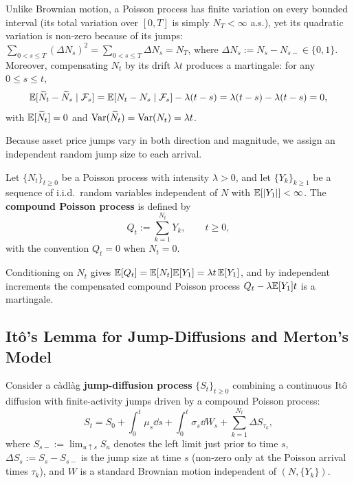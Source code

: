 Unlike Brownian motion, a Poisson process has finite variation on every bounded interval (its total variation over $[0, T]$ is simply $N_T < \infty$ a.s.), yet its quadratic variation is non-zero because of its jumps: $\sum_{0 < s \le T} (\Delta N_s)^2 = \sum_{0 < s \le T} \Delta N_s = N_T$, where $\Delta N_s := N_s - N_{s-} \in \{0, 1\}$. Moreover, compensating $N_t$ by its drift $\lambda t$ produces a martingale: for any $0 \le s \le t$,
\[
\mathbb{E}[\widetilde{N}_t - \widetilde{N}_s \mid \mathcal{F}_s] = \mathbb{E}[N_t - N_s \mid \mathcal{F}_s] - \lambda(t - s) = \lambda(t - s) - \lambda(t - s) = 0,
\]
with $\mathbb{E}[\widetilde{N}_t] = 0$ and $\operatorname{Var}(\widetilde{N}_t) = \operatorname{Var}(N_t) = \lambda t$.

Because asset price jumps vary in both direction and magnitude, we assign an independent random jump size to each arrival.

\begin{definition}
\label{def:compound-poisson}
Let $\{N_t\}_{t \ge 0}$ be a Poisson process with intensity $\lambda > 0$, and let $\{Y_k\}_{k \ge 1}$ be a sequence of i.i.d.\ random variables independent of $N$ with $\mathbb{E}[|Y_1|] < \infty$. The \textbf{compound Poisson process} is defined by
\[
Q_t := \sum_{k=1}^{N_t} Y_k, \qquad t \ge 0,
\]
with the convention $Q_t = 0$ when $N_t = 0$.
\end{definition}

Conditioning on $N_t$ gives $\mathbb{E}[Q_t] = \mathbb{E}[N_t]\mathbb{E}[Y_1] = \lambda t\,\mathbb{E}[Y_1]$, and by independent increments the compensated compound Poisson process $Q_t - \lambda \mathbb{E}[Y_1] t$ is a martingale.

\subsection{It\^o's Lemma for Jump-Diffusions and Merton's Model}
\label{subsec:jump-ito-merton}

Consider a c\`adl\`ag \textbf{jump-diffusion process} $\{S_t\}_{t \ge 0}$ combining a continuous It\^o diffusion with finite-activity jumps driven by a compound Poisson process:
\begin{equation}
\label{eq:jump-diffusion-general}
S_t = S_0 + \int_0^t \mu_s \dd s + \int_0^t \sigma_s \dd W_s + \sum_{k=1}^{N_t} \Delta S_{\tau_k},
\end{equation}
where $S_{s-} := \lim_{u \uparrow s} S_u$ denotes the left limit just prior to time $s$, $\Delta S_s := S_s - S_{s-}$ is the jump size at time $s$ (non-zero only at the Poisson arrival times $\tau_k$), and $W$ is a standard Brownian motion independent of $(N, \{Y_k\})$.


